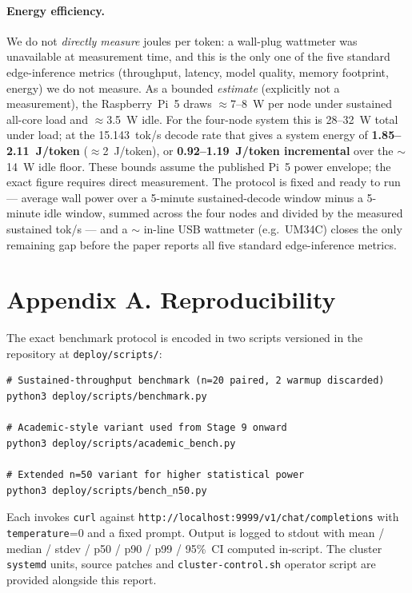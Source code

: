 \documentclass[10pt,a4paper]{article}
\providecommand{\euro}{}\renewcommand{\euro}{\texteuro}
\begin{document}
\paragraph{Energy efficiency.}
We do not \emph{directly measure} joules per token: a wall-plug wattmeter was unavailable at measurement time, and this is the only one of the five standard edge-inference metrics (throughput, latency, model quality, memory footprint, energy) we do not measure. As a bounded \emph{estimate} (explicitly not a measurement), the Raspberry~Pi~5 draws $\approx$7--8~W per node under sustained all-core load and $\approx$3.5~W idle. For the four-node system this is 28--32~W total under load; at the 15.143~tok/s decode rate that gives a system energy of \textbf{1.85--2.11~J/token} ($\approx$2~J/token), or \textbf{0.92--1.19~J/token incremental} over the $\sim$14~W idle floor. These bounds assume the published Pi~5 power envelope; the exact figure requires direct measurement. The protocol is fixed and ready to run --- average wall power over a 5-minute sustained-decode window minus a 5-minute idle window, summed across the four nodes and divided by the measured sustained tok/s --- and a $\sim$\euro15 in-line USB wattmeter (e.g.\ UM34C) closes the only remaining gap before the paper reports all five standard edge-inference metrics.

\section*{Appendix A. Reproducibility}

The exact benchmark protocol is encoded in two scripts versioned in the repository at \texttt{deploy/scripts/}:
\begin{lstlisting}
# Sustained-throughput benchmark (n=20 paired, 2 warmup discarded)
python3 deploy/scripts/benchmark.py

# Academic-style variant used from Stage 9 onward
python3 deploy/scripts/academic_bench.py

# Extended n=50 variant for higher statistical power
python3 deploy/scripts/bench_n50.py
\end{lstlisting}
Each invokes \texttt{curl} against \texttt{http://localhost:9999/v1/chat/completions} with \texttt{temperature}=0 and a fixed prompt. Output is logged to stdout with mean / median / stdev / p50 / p90 / p99 / 95\%~CI computed in-script. The cluster \texttt{systemd} units, source patches and \texttt{cluster-control.sh} operator script are provided alongside this report.
\end{document}
